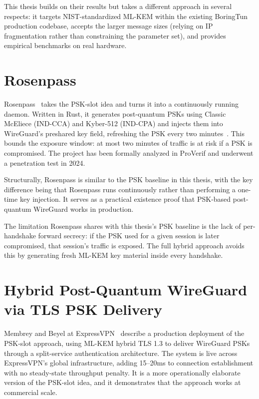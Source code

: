 This thesis builds on their results but takes a different approach in several respects: it targets NIST-standardized ML-KEM within the existing BoringTun production codebase, accepts the larger message sizes (relying on IP fragmentation rather than constraining the parameter set), and provides empirical benchmarks on real hardware.

\section{Rosenpass}

Rosenpass~\cite{rosenpass} takes the PSK-slot idea and turns it into a continuously running daemon. Written in Rust, it generates post-quantum PSKs using Classic McEliece (IND-CCA) and Kyber-512 (IND-CPA) and injects them into WireGuard's preshared key field, refreshing the PSK every two minutes~\cite{rosenpass-github}. This bounds the exposure window: at most two minutes of traffic is at risk if a PSK is compromised. The project has been formally analyzed in ProVerif and underwent a penetration test in 2024.

Structurally, Rosenpass is similar to the PSK baseline in this thesis, with the key difference being that Rosenpass runs continuously rather than performing a one-time key injection. It serves as a practical existence proof that PSK-based post-quantum WireGuard works in production.

The limitation Rosenpass shares with this thesis's PSK baseline is the lack of per-handshake forward secrecy: if the PSK used for a given session is later compromised, that session's traffic is exposed. The full hybrid approach avoids this by generating fresh ML-KEM key material inside every handshake.

\section{Hybrid Post-Quantum WireGuard via TLS PSK Delivery}

Membrey and Beyel at ExpressVPN~\cite{membrey2025expressvpn} describe a production deployment of the PSK-slot approach, using ML-KEM hybrid TLS 1.3 to deliver WireGuard PSKs through a split-service authentication architecture. The system is live across ExpressVPN's global infrastructure, adding 15--20ms to connection establishment with no steady-state throughput penalty. It is a more operationally elaborate version of the PSK-slot idea, and it demonstrates that the approach works at commercial scale.

